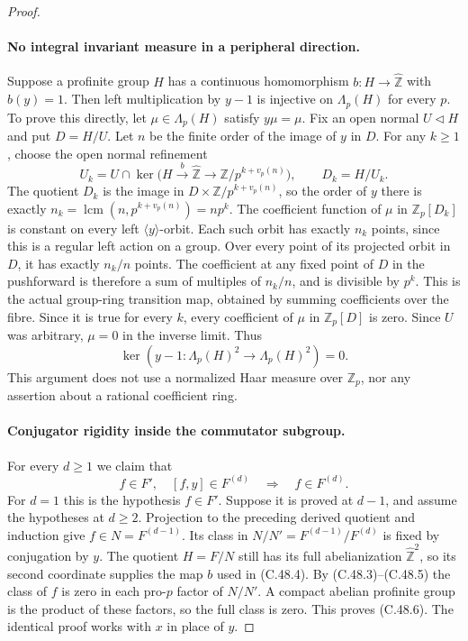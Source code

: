 \begin{proof}
\paragraph{No integral invariant measure in a peripheral direction.}
Suppose a profinite group $H$ has a continuous homomorphism
$b:H\to\widehat{\mathbb Z}$ with $b(y)=1$.
Then left multiplication by $y-1$ is injective on
$\Lambda_p(H)$ for every $p$.
To prove this directly, let $\mu\in\Lambda_p(H)$ satisfy
$y\mu=\mu$. Fix an open normal $U\triangleleft H$ and put
$D=H/U$. Let $n$ be the finite order of the image of $y$ in $D$.
For any $k\geq1$, choose the open normal refinement
\[
 U_k=U\cap\ker\bigl(H\xrightarrow{b}\widehat{\mathbb Z}
                   \longrightarrow\mathbb Z/p^{k+v_p(n)}\bigr),
 \qquad D_k=H/U_k.                                    \tag{C.48.4}
\]
The quotient $D_k$ is the image in
$D\times\mathbb Z/p^{k+v_p(n)}$, so the order of $y$ there is
exactly $n_k=\operatorname{lcm}(n,p^{k+v_p(n)})=np^k$.
The coefficient function of $\mu$ in $\mathbb Z_p[D_k]$ is
constant on every left $\langle y\rangle$-orbit.
Each such orbit has exactly $n_k$ points, since this is a regular
left action on a group. Over every point of its projected orbit
in $D$, it has exactly $n_k/n$ points.
The coefficient at any fixed point of $D$ in the pushforward is
therefore a sum of multiples of $n_k/n$, and is divisible by $p^k$.
This is the actual group-ring transition map, obtained by summing
coefficients over the fibre. Since it is true for every $k$, every
coefficient of $\mu$ in $\mathbb Z_p[D]$ is zero.
Since $U$ was arbitrary, $\mu=0$ in the inverse limit. Thus
\[
        \ker(y-1:\Lambda_p(H)^2\to\Lambda_p(H)^2)=0.   \tag{C.48.5}
\]
This argument does not use a normalized Haar measure over
$\mathbb Z_p$, nor any assertion about a rational coefficient ring.

\paragraph{Conjugator rigidity inside the commutator subgroup.}
For every $d\geq1$ we claim that
\[
 f\in F',\quad [f,y]\in F^{(d)}
                  \quad\Longrightarrow\quad f\in F^{(d)}.
                                                               \tag{C.48.6}
\]
For $d=1$ this is the hypothesis $f\in F'$.
Suppose it is proved at $d-1$, and assume the hypotheses at $d\geq2$.
Projection to the preceding derived quotient and induction give
$f\in N=F^{(d-1)}$. Its class in $N/N'=F^{(d-1)}/F^{(d)}$
is fixed by conjugation by $y$. The quotient $H=F/N$ still has
its full abelianization $\widehat{\mathbb Z}^2$, so its second
coordinate supplies the map $b$ used in (C.48.4).
By (C.48.3)--(C.48.5) the class of $f$ is zero in each pro-$p$
factor of $N/N'$. A compact abelian profinite group is the product
of these factors, so the full class is zero. This proves (C.48.6).
The identical proof works with $x$ in place of $y$.


\end{proof}
